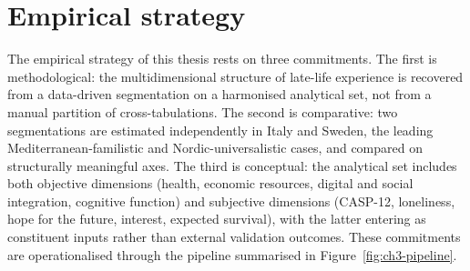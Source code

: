 \label{ch:ch3}

\section{Empirical strategy}
\label{sec:ch3-empirical-strategy}

The empirical strategy of this thesis rests on three commitments. The first is methodological: the multidimensional structure of late-life experience is recovered from a data-driven segmentation on a harmonised analytical set, not from a manual partition of cross-tabulations. The second is comparative: two segmentations are estimated independently in Italy and Sweden, the leading Mediterranean-familistic and Nordic-universalistic cases, and compared on structurally meaningful axes. The third is conceptual: the analytical set includes both objective dimensions (health, economic resources, digital and social integration, cognitive function) and subjective dimensions (CASP-12, loneliness, hope for the future, interest, expected survival), with the latter entering as constituent inputs rather than external validation outcomes. These commitments are operationalised through the pipeline summarised in Figure~\ref{fig:ch3-pipeline}.

